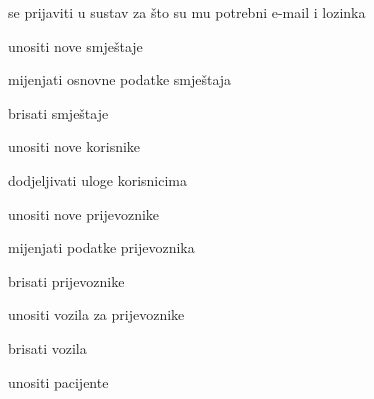 			
			\begin{packed_enum}
				\item  {}
				
				\begin{packed_enum}
					
					\item se prijaviti u sustav za što su mu potrebni e-mail i lozinka
					
				\end{packed_enum}
			
				\item  {}
				
				\begin{packed_enum}
					
					\item unositi nove smještaje
					\item mijenjati osnovne podatke smještaja
					\item brisati smještaje
					\item unositi nove korisnike
					\item dodjeljivati uloge korisnicima
					
				\end{packed_enum}
				
				\item  {}
				
				\begin{packed_enum}
					
					\item unositi nove prijevoznike
					\item mijenjati podatke prijevoznika
					\item brisati prijevoznike
					\item unositi vozila za prijevoznike
					\item brisati vozila
					
				\end{packed_enum}
				
				\item  {}
				
				\begin{packed_enum}
					
					\item unositi pacijente
					
				\end{packed_enum}
				

\end{packed_enum}
